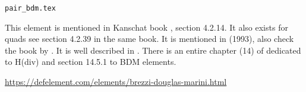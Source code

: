 \begin{flushright} {\tiny {\color{gray} \tt  pair\_bdm.tex}} \end{flushright}

This element is mentioned in Kanschat book \cite{kanschat}, section 4.2.14. 
It also exists for quads see section 4.2.39 in the same book.
It is mentioned in \textcite{chen93a} (1993), also check the book by \textcite{brfo}.
It is well described in \textcite{kanschat17}.
There is an entire chapter (14) of \textcite{ergu21_72} dedicated to H(div) and 
section 14.5.1 to BDM elements. 

\begin{center}
\url{https://defelement.com/elements/brezzi-douglas-marini.html}
\end{center}
